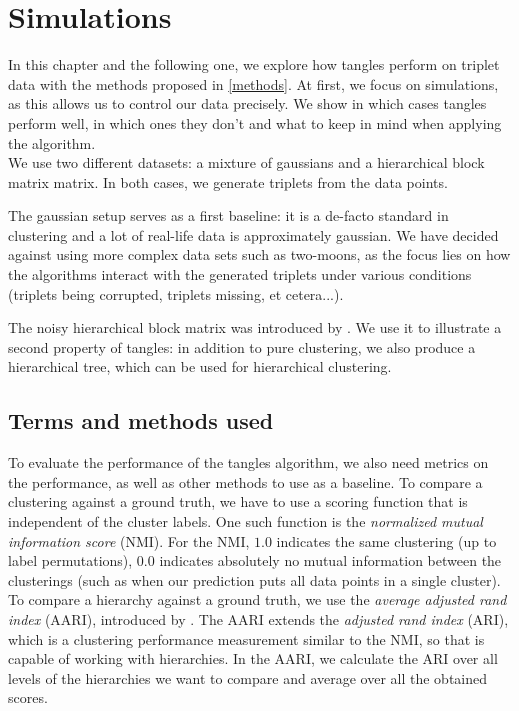\chapter{Simulations}\label{simulations}
In this chapter and the following one, we explore how tangles perform on triplet data with the methods proposed in \autoref{methods}. 
At first, we focus on simulations, as this allows us to control our data precisely. 
We show in which cases tangles perform well, in which ones they don't and what to keep in mind when applying the algorithm. \\

We use two different datasets: a mixture of gaussians and a hierarchical block matrix matrix. In both cases, we generate triplets from the data points.

The gaussian setup serves as a first baseline: it is a de-facto standard in clustering and a lot of real-life data is approximately gaussian. 
We have decided against using more complex data sets such as two-moons, as the focus lies on how the algorithms
interact with the generated triplets under various conditions (triplets being corrupted, triplets missing, et cetera...). 

The noisy hierarchical block matrix was introduced by \cite{balakrishnanNoiseThresholdsSpectral2011}.
We use it to illustrate a second property of tangles: in addition to pure clustering, we also produce a hierarchical tree, 
which can be used for hierarchical clustering. 

\section{Terms and methods used}
To evaluate the performance of the tangles algorithm, we also need metrics on the performance, as well as other methods to use as a baseline. 
To compare a clustering against a ground truth, we have to use a scoring function that is independent of the cluster labels. 
One such function is the \textit{normalized mutual information score} (NMI). 
For the NMI, $1.0$ indicates the same clustering (up to label permutations), $0.0$ indicates absolutely no mutual information between the clusterings (such as when our prediction
puts all data points in a single cluster). To compare a hierarchy against a ground truth, we use the \textit{average adjusted rand index} (AARI), 
introduced by \cite{ghoshdastidarFoundationsComparisonBasedHierarchical2019}. The AARI extends the \textit{adjusted rand index} (ARI), which is a clustering performance measurement
similar to the NMI, so that is capable of working with hierarchies. In the AARI, we calculate the ARI over all levels of the hierarchies we want to compare and average over all the obtained scores. 

